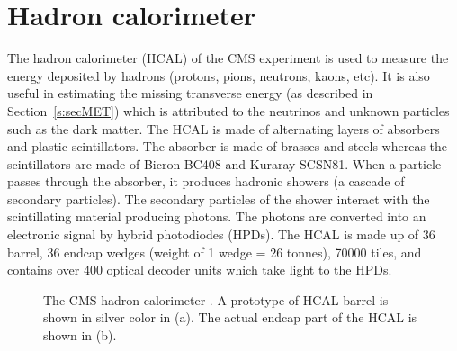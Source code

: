 
\section{\rm{H}adron calorimeter}
The hadron calorimeter (HCAL) of the CMS experiment is used to measure the 
energy deposited
by hadrons (protons, pions, neutrons, kaons, etc). It is also useful
in estimating the missing transverse energy (as described in Section~\ref{s:secMET}) 
which is attributed to the neutrinos and unknown particles such as the dark 
matter. The HCAL is made of alternating layers of absorbers and plastic scintillators.
The absorber is made of brasses and steels whereas the scintillators are made
of Bicron-BC408 and Kuraray-SCSN81. When a particle passes through the 
absorber, it produces hadronic showers (a cascade of secondary particles). The 
secondary particles of the shower interact with the scintillating material
producing photons. The photons are converted into an electronic signal by hybrid
photodiodes (HPDs). The HCAL is made up of 36 barrel, 36 endcap wedges 
(weight of 1 wedge = 26 tonnes), 70000 tiles, and contains over 400 
optical decoder units which take light to the HPDs.
\begin{figure}
  \centering
  \hfil
	\caption{The CMS hadron calorimeter \cite{Collaboration_2008_CMS}. A prototype of 
	HCAL barrel is shown in silver color in (a). The actual endcap part of the HCAL 
	is shown in (b).}
  \label{fig:cms_hcal}
\end{figure}

